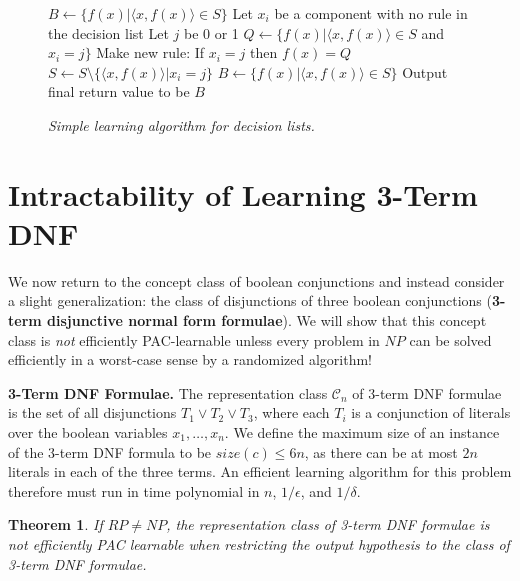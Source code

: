 \documentclass{article}
\newtheorem{thm}{Theorem}
\DeclarePairedDelimiter\abs{\lvert}{\rvert}
\begin{document}
\begin{figure}[H]
\begin{framed}
    \begin{algorithmic}
        \State $B \leftarrow \{f(x) | \langle x, f(x) \rangle \in S\}$
            \State Let $x_i$ be a component with no rule in the decision list
            \State Let $j$ be 0 or 1
            \State $Q \leftarrow \{f(x) | \langle x, f(x) \rangle \in S$ and $x_i = j \}$
                \State Make new rule: If $x_i = j$ then $f(x) = Q$
                \State $S \leftarrow S \setminus \{ \langle x, f(x) \rangle | x_i = j \}$
            \EndIf
            \State $B \leftarrow \{f(x) | \langle x, f(x) \rangle \in S\}$
        \EndWhile
        \State Output final return value to be $B$
    \end{algorithmic}
\end{framed}
\begin{center}
    \emph{Simple learning algorithm for decision lists.}
\end{center}
\end{figure}


\section{Intractability of Learning 3-Term DNF}

We now return to the concept class of boolean conjunctions and instead consider
a slight generalization: the class of disjunctions of three boolean conjunctions
(\textbf{3-term disjunctive normal form formulae}). We will show that this concept
class is \emph{not} efficiently PAC-learnable unless every problem in $NP$ can be
solved efficiently in a worst-case sense by a randomized algorithm!

\textbf{3-Term DNF Formulae.} The representation class $\mathcal{C}_n$ of 3-term
DNF formulae is the set of all disjunctions $T_1 \vee T_2 \vee T_3$, where each
$T_i$ is a conjunction of literals over the boolean variables $x_1, \dots, x_n$.
We define the maximum size of an instance of the 3-term DNF formula to be
$size(c) \leq 6n$, as there can be at most $2n$ literals in each of the three
terms. An efficient learning algorithm for this problem therefore must run in
time polynomial in $n$, $1/\epsilon$, and $1/\delta$.\\

\begin{framed}
\begin{thm}
    If $RP \neq NP$, the representation class of 3-term DNF formulae is not
    efficiently PAC learnable when restricting the output hypothesis to the
    class of 3-term DNF formulae.
\end{thm}
\end{framed}
\end{document}
